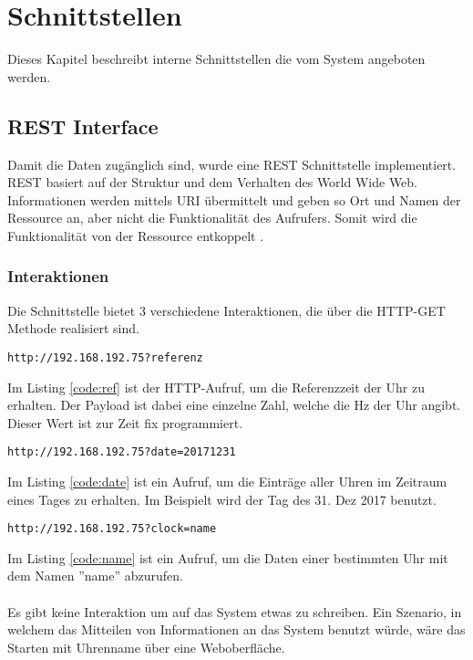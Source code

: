 \section{Schnittstellen}
Dieses Kapitel beschreibt interne Schnittstellen die vom System angeboten werden.
\subsection{REST Interface}\label{sec:rest}
Damit die Daten zugänglich sind, wurde eine REST Schnittstelle implementiert.\\
REST basiert auf der Struktur und dem Verhalten des World Wide Web. Informationen werden mittels URI übermittelt und geben so Ort und Namen der Ressource an, aber nicht die Funktionalität des Aufrufers. Somit wird die Funktionalität von der Ressource entkoppelt \cite{rest}.
\subsubsection{Interaktionen}
Die Schnittstelle bietet 3 verschiedene Interaktionen, die über die HTTP-GET Methode realisiert sind.\\

\begin{lstlisting}[caption="Lesen der Referenzzeit",label={code:ref}]
http://192.168.192.75?referenz
\end{lstlisting}
Im Listing \ref{code:ref} ist der HTTP-Aufruf, um die Referenzzeit der Uhr zu erhalten. Der Payload ist dabei eine einzelne Zahl, welche die Hz der Uhr angibt. Dieser Wert ist zur Zeit fix programmiert.\\

\begin{lstlisting}[caption="Lesen eines bestimmten Tages",label={code:date}]
http://192.168.192.75?date=20171231
\end{lstlisting}
Im Listing \ref{code:date} ist ein Aufruf, um die Einträge aller Uhren im Zeitraum eines Tages zu erhalten. Im Beispielt wird der Tag des 31. Dez 2017 benutzt.\\

\begin{lstlisting}[caption="Lesen einer bestimmten Uhr",label={code:name}]
http://192.168.192.75?clock=name
\end{lstlisting}
Im Listing \ref{code:name} ist ein Aufruf, um die Daten einer bestimmten Uhr mit dem Namen ''name'' abzurufen.\\
\\
Es gibt keine Interaktion um auf das System etwas zu schreiben. Ein Szenario, in welchem das Mitteilen von Informationen an das System benutzt würde, wäre das Starten mit Uhrenname über eine Weboberfläche.

